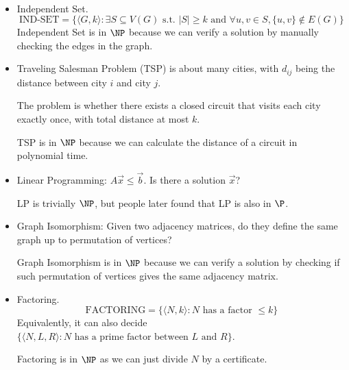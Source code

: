 \begin{eg}
	$ $
	\begin{itemize}
		\item Independent Set.
		      \[ \text{IND-SET} = \{ \langle G,k\rangle : \exists S \subseteq V(G) \text{ s.t. } |S| \geq k \text{ and } \forall u,v \in S, \{u,v\} \notin E(G) \} \]
		      Independent Set is in $\NP$ because we can verify a solution by manually checking the edges in the graph.
		\item Traveling Salesman Problem (TSP) is about many cities, with $d_{ij}$ being the distance between city $i$ and city $j$.

		      The problem is whether there exists a closed circuit that visits each city exactly once, with total distance at most $k$.

		      TSP is in $\NP$ because we can calculate the distance of a circuit in polynomial time.
		\item Linear Programming: $A\vec{x} \leq \vec{b}$. Is there a solution $\vec{x}$?

		      LP is trivially $\NP$, but people later found that LP is also in $\P$.
		\item Graph Isomorphism: Given two adjacency matrices, do they define the same graph up to permutation of vertices?

		      Graph Isomorphism is in $\NP$ because we can verify a solution by checking if such permutation of vertices gives the same adjacency matrix.
		\item Factoring.
		      \[ \text{FACTORING} = \{ \langle N,k\rangle : N \text{ has a factor } \leq k \} \]
		      Equivalently, it can also decide $\{ \langle N, L, R\rangle : N \text{ has a prime factor between } L \text{ and } R \}$.

		      Factoring is in $\NP$ as we can just divide $N$ by a certificate.
	\end{itemize}
\end{eg}


